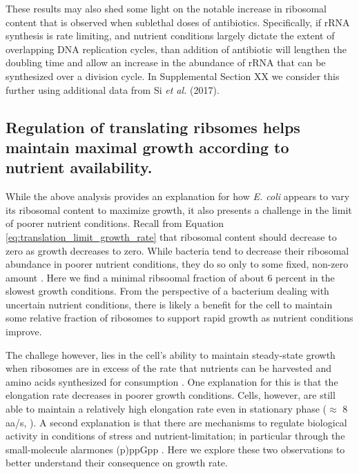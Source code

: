 These results may also shed some light on the notable increase in ribosomal content
that is observed when sublethal doses of antibiotics. Specifically, if rRNA synthesis
is rate limiting, and nutrient
conditions largely dictate the extent of overlapping DNA replication cycles, than
addition of antibiotic will lengthen the doubling time and
allow an increase in the abundance of rRNA that can be synthesized over a division cycle.
In Supplemental Section XX we consider this further using additional data from
Si \textit{et al.} (2017).

\subsection{Regulation of translating ribsomes helps maintain maximal growth
according to nutrient availability.}

While the above analysis provides an explanation for how \textit{E. coli} appears to vary its ribosomal content to maximize growth, it also presents a challenge in
the limit of poorer nutrient conditions. Recall from Equation
\ref{eq:translation_limit_growth_rate} that ribosomal content should decrease to
zero as growth decreases to zero. While bacteria tend to decrease their
ribosomal abundance in poorer nutrient conditions, they do so only to some
fixed, non-zero amount \citep{scott2010, liebermeister2014}. Here we find a
minimal ribsoomal fraction of about 6 percent in the slowest growth conditions.
From the perspective of a bacterium dealing with uncertain nutrient conditions,
there is likely a benefit for the cell to maintain some relative fraction of
ribosomes to support rapid growth as nutrient conditions improve.

The challege however, lies in the cell's ability to maintain steady-state growth
when ribosomes are in excess of the rate that nutrients can be harvested and
amino  acids synthesized for consumption . One
explanation for this is that the elongation rate decreases in poorer growth
conditions. Cells, however, are still able to maintain a relatively high
elongation rate even in stationary phase ($\approx$ 8 aa/s, \citep{dai2016,
dai2018}). A second explanation is that there are mechanisms to
regulate biological activity in conditions of stress and nutrient-limitation; in
particular through the small-molecule alarmones (p)ppGpp \citep{harris2018}.
Here we explore these two observations to better understand
their consequence on growth rate.


